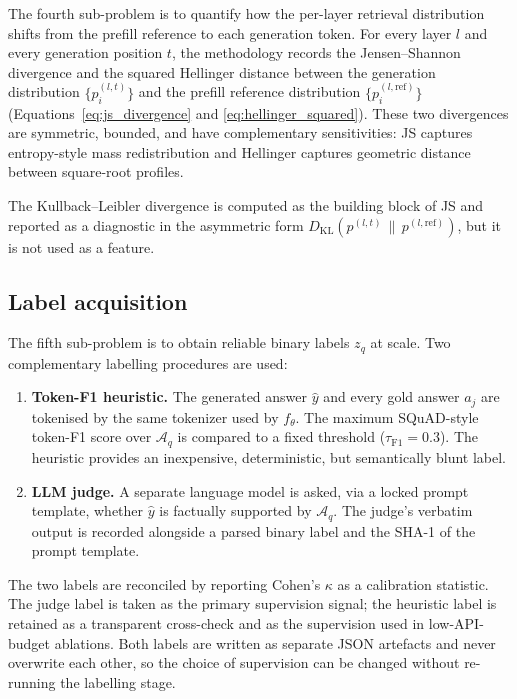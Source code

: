 The fourth sub-problem is to quantify how the per-layer retrieval
distribution shifts from the prefill reference to each generation token.
For every layer $l$ and every generation position $t$, the methodology
records the Jensen–Shannon divergence and the squared Hellinger distance
between the generation distribution $\{p_i^{(l,t)}\}$ and the prefill
reference distribution $\{p_i^{(l,\mathrm{ref})}\}$
(Equations~\ref{eq:js_divergence} and \ref{eq:hellinger_squared}). These
two divergences are symmetric, bounded, and have complementary
sensitivities: JS captures entropy-style mass redistribution and Hellinger
captures geometric distance between square-root profiles.

The Kullback–Leibler divergence is computed as the building block of JS
and reported as a diagnostic in the asymmetric form
$D_{\mathrm{KL}}(p^{(l,t)} \,\|\, p^{(l,\mathrm{ref})})$, but it is not used
as a feature.

\subsection{Label acquisition}
\label{subsec:labels}

The fifth sub-problem is to obtain reliable binary labels $z_q$ at scale.
Two complementary labelling procedures are used:

\begin{enumerate}[leftmargin=*]
    \item \textbf{Token-F1 heuristic.} The generated answer $\hat{y}$ and
          every gold answer $a_j$ are tokenised by the same tokenizer
          used by $f_\theta$. The maximum SQuAD-style token-F1 score
          over $\mathcal{A}_q$ is compared to a fixed threshold
          ($\tau_{\mathrm{F1}} = 0.3$). The heuristic provides an
          inexpensive, deterministic, but semantically blunt label.
    \item \textbf{LLM judge.} A separate language model is asked, via a
          locked prompt template, whether $\hat{y}$ is factually supported
          by $\mathcal{A}_q$. The judge's verbatim output is recorded
          alongside a parsed binary label and the SHA-1 of the prompt
          template.
\end{enumerate}

The two labels are reconciled by reporting Cohen's $\kappa$ as a
calibration statistic. The judge label is taken as the primary supervision
signal; the heuristic label is retained as a transparent cross-check and
as the supervision used in low-API-budget ablations. Both labels are
written as separate JSON artefacts and never overwrite each other, so the
choice of supervision can be changed without re-running the labelling
stage.

